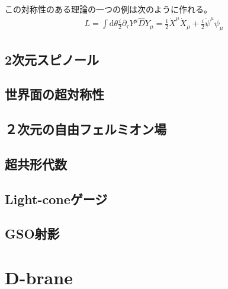 \documentclass[report,paper=a4, fontsize=12pt, line_length=16cm, number_of_lines=33,dvipdfmx]{jlreq}
\numberwithin{equation}{chapter}
\numberwithin{equation}{section}
\newcommand{\del}{\partial}
\newcommand{\Dh}{\widehat{D}}
\newcommand{\di}{\mathrm{d}}
\begin{document}
この対称性のある理論の一つの例は次のように作れる。
\begin{align}
L=\int \di \theta \frac{i}{2}\del_{\tau} Y^{\mu} \Dh Y_{\mu}
=\frac12 \dot{X}^{\mu}\dot{X}_{\mu} +\frac i2 \dot{\psi}^{\mu} \psi_{\mu}
\end{align}
\section{2次元スピノール}

\section{世界面の超対称性}

\section{２次元の自由フェルミオン場}

\section{超共形代数}

\section{Light-coneゲージ}

\section{GSO射影}








\chapter{D-brane}
\end{document}
